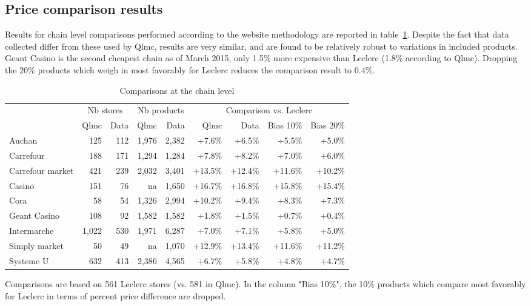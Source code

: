 \documentclass[english]{article}
\begin{document}
\subsection{Price comparison results}

Results for chain level comparisons performed according to the website methodology are reported in table~\ref{tab:qlmc_chain_comparisons}. Despite the fact that data collected differ from these used by Qlmc, results are very similar, and are found to be relatively robust to variations in included products. Geant Casino is the second cheapest chain as of March 2015, only 1.5\% more expensive than Leclerc (1.8\% according to Qlmc). Dropping the 20\% products which weigh in most favorably for Leclerc reduces the comparison result to 0.4\%.

\begin{table}[H]
\caption{Comparisons at the chain level}
\label{tab:qlmc_chain_comparisons}
\begin{threeparttable}
\renewcommand{\arraystretch}{0.7}%
\small
\begin{tabular}{l|rr|rr|rrrr}
\toprule
\toprule
          & \multicolumn{2}{c|}{Nb stores} &  \multicolumn{2}{c|}{Nb products} & \multicolumn{4}{c}{Comparison vs. Leclerc} \\
           & Qlmc  & Data  & Qlmc  & Data  & Qlmc  & Data  & Bias 10\% & Bias 20\% \\
\midrule
    Auchan & 125   & 112   & 1,976 & 2,382 & +7.6\% & +6.5\% & +5.5\% & +5.0\% \\
    Carrefour & 188   & 171   & 1,294 & 1,284 & +7.8\% & +8.2\% & +7.0\% & +6.0\% \\
    Carrefour market & 421   & 239   & 2,032 & 3,401 & +13.5\% & +12.4\% & +11.6\% & +10.2\% \\
    Casino & 151   & 76    & na    & 1,650 & +16.7\% & +16.8\% & +15.8\% & +15.4\% \\
    Cora  & 58    & 54    & 1,326 & 2,994 & +10.2\% & +9.4\% & +8.3\% & +7.3\% \\
    Geant Casino & 108   & 92    & 1,582 & 1,582 & +1.8\% & +1.5\% & +0.7\% & +0.4\% \\
    Intermarche & 1,022 & 530   & 1,971 & 6,287 & +7.0\% & +7.1\% & +5.8\% & +5.0\% \\
    Simply market & 50    & 49    & na    & 1,070 & +12.9\% & +13.4\% & +11.6\% & +11.2\% \\
    Systeme U & 632   & 413   & 2,386 & 4,565 & +6.7\% & +5.8\% & +4.8\% & +4.7\% \\
\bottomrule
\bottomrule
\end{tabular}
\begin{tablenotes}
      \small
      \item Comparisons are based on 561 Leclerc stores (vs. 581 in Qlmc). In the column "Bias 10\%", the 10\% products which compare most favorably for Leclerc in terms of percent price difference are dropped.
\end{tablenotes}
\end{threeparttable}
\end{table}
\end{document}
